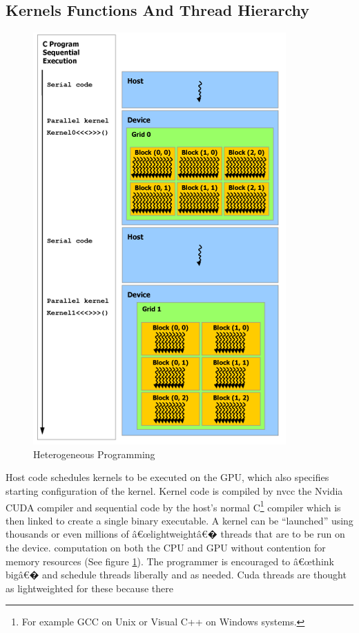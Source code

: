 \subsection{Kernels Functions And Thread Hierarchy}\label{kernels}
\begin{figure}
\includegraphics[scale=0.9]{./images/heterogeneous-programming}
\caption{Heterogeneous Programming}\label{heterogeneous-programming}
\end{figure}
Host code schedules kernels to be executed on the GPU, which also specifies
starting configuration of the kernel.
Kernel code is compiled by nvcc the Nvidia CUDA compiler and sequential code by
the host's normal C\footnote{For example GCC on Unix or Visual C++ on Windows
systems.} compiler which is then linked to create a single binary executable.
A kernel can be ``launched'' using thousands
or even millions of â€œlightweightâ€� threads that are to be run on the device.
computation on both the CPU and GPU without contention for memory resources (See figure \ref{heterogeneous-programming}).
The programmer is encouraged to â€œthink bigâ€� and schedule threads liberally and
as needed. Cuda threads are thought as lightweighted for these because there
